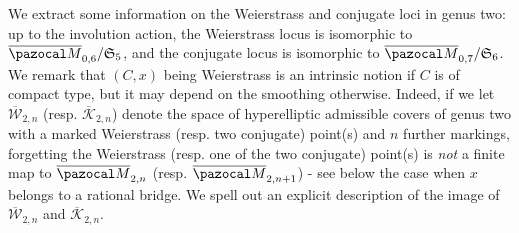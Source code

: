 \documentclass{compositio}
\newcommand{\oM}{\overline{\pazocal M}}
\theoremstyle{plain}
\theoremstyle{definition}
\theoremstyle{remark}
\begin{document}
 We extract some information on the Weierstrass and conjugate loci in genus two: up to the involution action, the Weierstrass locus is isomorphic to $\oM_{0,6}/\mathfrak S_5$, and the conjugate locus is isomorphic to  $\oM_{0,7}/\mathfrak S_6$. We remark that $(C,x)$ being Weierstrass is an intrinsic notion if $C$ is of compact type, but it may depend on the smoothing otherwise. Indeed, if we let $\overline{\mathcal W}_{2,n}$ (resp. $\overline{\mathcal K}_{2,n}$) denote the space of hyperelliptic admissible covers of genus two with a marked Weierstrass (resp. two conjugate) point(s) and $n$ further markings, forgetting the Weierstrass (resp. one of the two conjugate) point(s) is \emph{not} a finite map to $\oM_{2,n}$ (resp. $\oM_{2,n+1}$) - see below the case when $x$ belongs to a rational bridge. We spell out an explicit description of the image of $\overline{\mathcal W}_{2,n}$ and $\overline{\mathcal K}_{2,n}$.
\end{document}
